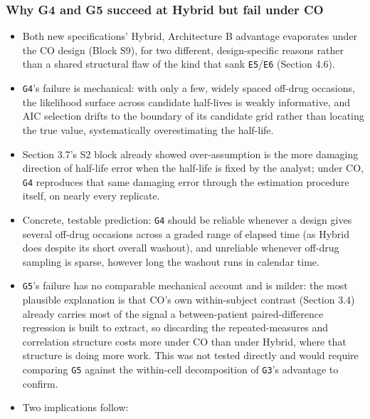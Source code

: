 \documentclass[
  11pt,
]{article}
\providecommand{\tightlist}{%
  \setlength{\itemsep}{0pt}\setlength{\parskip}{0pt}}
\begin{document}
\subsubsection{Why G4 and G5 succeed at Hybrid but fail under CO}\label{why-g4-and-g5-succeed-at-hybrid-but-fail-under-co}

\begin{itemize}
\tightlist
\item
  Both new specifications' Hybrid, Architecture B advantage
  evaporates under the CO design (Block S9), for two different,
  design-specific reasons rather than a shared structural flaw of the
  kind that sank \texttt{E5}/\texttt{E6} (Section 4.6).
\item
  \texttt{G4}'s failure is mechanical: with only a few, widely spaced
  off-drug occasions, the likelihood surface across candidate
  half-lives is weakly informative, and AIC selection drifts to the
  boundary of its candidate grid rather than locating the true value,
  systematically overestimating the half-life.
\item
  Section 3.7's S2 block already showed over-assumption is the more
  damaging direction of half-life error when the half-life is fixed
  by the analyst; under CO, \texttt{G4} reproduces that same damaging error
  through the estimation procedure itself, on nearly every replicate.
\item
  Concrete, testable prediction: \texttt{G4} should be reliable whenever a
  design gives several off-drug occasions across a graded range of
  elapsed time (as Hybrid does despite its short overall washout),
  and unreliable whenever off-drug sampling is sparse, however long
  the washout runs in calendar time.
\item
  \texttt{G5}'s failure has no comparable mechanical account and is milder:
  the most plausible explanation is that CO's own within-subject
  contrast (Section 3.4) already carries most of the signal a
  between-patient paired-difference regression is built to extract,
  so discarding the repeated-measures and correlation structure costs
  more under CO than under Hybrid, where that structure is doing more
  work. This was not tested directly and would require comparing
  \texttt{G5} against the within-cell decomposition of \texttt{G3}'s advantage to
  confirm.
\item
  Two implications follow:


\end{itemize}
\end{document}
